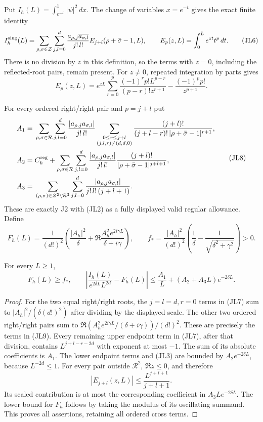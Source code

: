 Put \(I_h(L)=\int_{e^{-L}}^1|\psi|^2\,dx\).
The change of variables \(x=e^{-t}\) gives the exact finite identity
\[
I_h^{\rm sing}(L)=
\sum_{\rho,\sigma\in\mathcal Z}\sum_{j,l=0}^d
\frac{a_{\rho,j}\overline{a_{\sigma,l}}}{j!\,l!}
E_{j+l}(\rho+\bar\sigma-1,L),\qquad
E_p(z,L)=\int_0^L e^{zt}t^p\,dt.
\tag{JL6}
\]
There is no division by \(z\) in this definition, so the terms with
\(z=0\), including the reflected-root pairs, remain present.
For \(z\ne0\), repeated integration by parts gives
\[
E_p(z,L)=e^{zL}\sum_{r=0}^p
\frac{(-1)^r p!L^{p-r}}{(p-r)!z^{r+1}}
-\frac{(-1)^p p!}{z^{p+1}}.
\tag{JL7}
\]

For every ordered right/right pair and \(p=j+l\) put
\[
\begin{split}
A_1={}&\sum_{\rho,\sigma\in\mathcal R}\sum_{j,l=0}^d
\frac{|a_{\rho,j}a_{\sigma,l}|}{j!\,l!}
\sum_{\substack{0\le r\le j+l\\(j,l,r)\ne(d,d,0)}}
\frac{(j+l)!}{(j+l-r)!\,|\rho+\bar\sigma-1|^{r+1}},\\
A_2={}&C_h^{\rm reg}+
\sum_{\rho,\sigma\in\mathcal R}\sum_{j,l=0}^d
\frac{|a_{\rho,j}a_{\sigma,l}|}{j!\,l!}
\frac{(j+l)!}{|\rho+\bar\sigma-1|^{j+l+1}},\\
A_3={}&
\sum_{(\rho,\sigma)\in\mathcal Z^2\setminus\mathcal R^2}
\sum_{j,l=0}^d
\frac{|a_{\rho,j}a_{\sigma,l}|}{j!\,l!\,(j+l+1)}.
\end{split}
\tag{JL8}
\]
These are exactly J2 with (JL2) as a fully displayed valid regular
allowance.  Define
\[
F_h(L)=\frac1{(d!)^2}
\left(\frac{|A_h|^2}{\delta}
+\Re\frac{A_h^2e^{2i\gamma L}}{\delta+i\gamma}\right),
\qquad
f_*=\frac{|A_h|^2}{(d!)^2}
\left(\frac1\delta-\frac1{\sqrt{\delta^2+\gamma^2}}\right)>0.
\tag{JL9}
\]

\begin{proposition}
For every \(L\ge1\),
\[
F_h(L)\ge f_*,
\qquad
\left|\frac{I_h(L)}{e^{2\delta L}L^{2d}}-F_h(L)\right|
\le \frac{A_1}{L}+(A_2+A_3L)e^{-2\delta L}.
\tag{JL10}
\]
\end{proposition}
\begin{proof}
For the two equal right/right roots, the \(j=l=d,r=0\) terms in
(JL7) sum to
\(|A_h|^2/(\delta(d!)^2)\) after dividing by the displayed scale.
The other two ordered right/right pairs sum to
\(\Re(A_h^2e^{2i\gamma L}/(\delta+i\gamma))/(d!)^2\).
These are precisely the terms in (JL9).
Every remaining upper endpoint term in (JL7), after that division,
contains \(L^{j+l-r-2d}\) with exponent at most \(-1\).
The sum of its absolute coefficients is \(A_1\).
The lower endpoint terms and (JL3) are bounded by
\(A_2e^{-2\delta L}\), because \(L^{-2d}\le1\).
For every pair outside \(\mathcal R^2\), \(\Re z\le0\), and therefore
\[
|E_{j+l}(z,L)|\le \frac{L^{j+l+1}}{j+l+1}.
\]
Its scaled contribution is at most the corresponding coefficient in
\(A_3Le^{-2\delta L}\).
The lower bound for \(F_h\) follows by taking the modulus of its
oscillating summand.  This proves all assertions, retaining all ordered
cross terms.
\end{proof}

